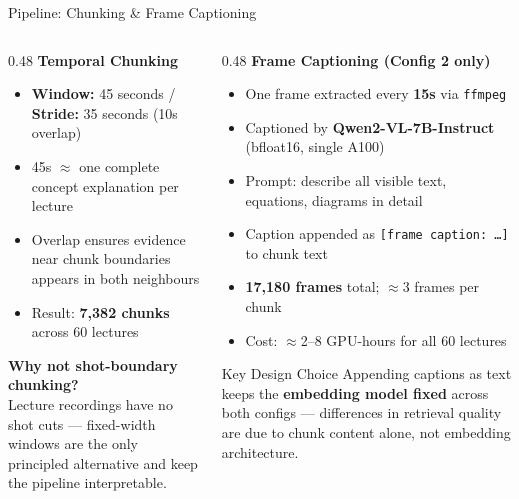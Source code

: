 \documentclass[aspectratio=169,t]{beamer}
\begin{document}
\begin{frame}{Pipeline: Chunking \& Frame Captioning}

\begin{columns}[T]
\begin{column}{0.48\textwidth}
  \textbf{Temporal Chunking}
  \begin{itemize}
    \item \textbf{Window:} 45 seconds / \textbf{Stride:} 35 seconds (10s overlap)
    \item 45s $\approx$ one complete concept explanation per lecture
    \item Overlap ensures evidence near chunk boundaries appears in both neighbours
    \item Result: \textbf{7,382 chunks} across 60 lectures
  \end{itemize}

  \medskip
  \textbf{Why not shot-boundary chunking?}\\
  Lecture recordings have no shot cuts — fixed-width windows are the only
  principled alternative and keep the pipeline interpretable.
\end{column}
\begin{column}{0.48\textwidth}
  \textbf{Frame Captioning (Config 2 only)}
  \begin{itemize}
    \item One frame extracted every \textbf{15s} via \texttt{ffmpeg}
    \item Captioned by \textbf{Qwen2-VL-7B-Instruct} (bfloat16, single A100)
    \item Prompt: describe all visible text, equations, diagrams in detail
    \item Caption appended as \texttt{[frame caption: \ldots]} to chunk text
    \item \textbf{17,180 frames} total; $\approx$3 frames per chunk
    \item Cost: $\approx$2--8 GPU-hours for all 60 lectures
  \end{itemize}

  \medskip
  \begin{exampleblock}{Key Design Choice}
    Appending captions as text keeps the \textbf{embedding model fixed}
    across both configs — differences in retrieval quality are due to chunk
    content alone, not embedding architecture.
  \end{exampleblock}
\end{column}
\end{columns}

\end{frame}
\end{document}
